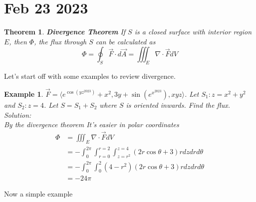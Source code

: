 \documentclass[11pt]{article}
\newtheorem{thm}{Theorem}
\newtheorem{ex}{Example}
\begin{document}
      \section{Feb 23 2023}
      \begin{thm}
        \textbf{Divergence Theorem}
        If $S$ is a closed surface with interior region $E$, then $\Phi$, the flux through $S$ can be calculated as
        \[\Phi = \oint_{S} \vec{F} \cdot d\vec{A} = \iiint_{E} \nabla \cdot \vec{F} dV \]
        \end{thm}
      Let's start off with some examples to review divergence.
      \begin{ex}
        $\vec{F} = \langle e^{\cos (yz^{2023})} + x^{2}, 3y + \sin(e^{x^{2023}}) , xyz \rangle $.  Let $S_{1} : z =x^{2}+y^{2}$ and
        $S_{2}: z = 4$. Let $S = S_{1} + S_{2}$ where $S$ is oriented inwards. Find the flux. \\
        Solution: \\
        By the divergence theorem
        It's easier in polar coordinates
        \begin{align*}
          \Phi
          &= \iiint_{E} \nabla \cdot \vec{F} dV \\
          &= -\int_{0}^{2\pi}\int_{r=0}^{r=2}\int_{z=r^{2}}^{z=4}(2r\cos\theta + 3)r dz dr d\theta\\
          &= -\int_{0}^{2\pi}\int_{0}^{2}(4-r^{2})(2r\cos\theta + 3)r dz dr d\theta\\
            &= -24\pi
        \end{align*}
      \end{ex}
      Now a simple example
\end{document}
